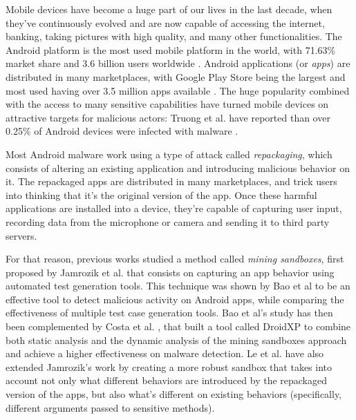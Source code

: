 Mobile devices have become a huge part of our lives in the last decade, when they've continuously evolved and are now capable of accessing the internet, banking, taking pictures with high quality, and many other functionalities. The Android platform is the most used mobile platform in the world, with 71.63\% market share and 3.6 billion users worldwide \cite{turner_how_nodate}. Android applications (or \textit{apps}) are distributed in many marketplaces, with Google Play Store being the largest and most used having over 3.5 million apps available \cite{turner_how_nodate-1}. The huge popularity combined with the access to many sensitive capabilities have turned mobile devices on attractive targets for malicious actors: Truong et al. have reported than over 0.25\% of Android devices were infected with malware \cite{truong_company_2014}.

Most Android malware work using a type of attack called \textit{repackaging}, which consists of altering an existing application and introducing malicious behavior on it. The repackaged apps are distributed in many marketplaces, and trick users into thinking that it's the original version of the app. Once these harmful applications are installed into a device, they're capable of capturing user input, recording data from the microphone or camera and sending it to third party servers.

For that reason, previous works studied a method called \textit{mining sandboxes}, first proposed by Jamrozik et al. \cite{jamrozik_mining_2016} that consists on capturing an app behavior using automated test generation tools. This technique was shown by Bao et al \cite{bao_mining_2018} to be an effective tool to detect malicious activity on Android apps, while comparing the effectiveness of multiple test case generation tools. Bao et al's study has then been complemented by Costa et al. \cite{costa_exploring_2022}, that built a tool called DroidXP to combine both static analysis and the dynamic analysis of the mining sandboxes approach and achieve a higher effectiveness on malware detection. Le et al.  \cite{le_towards_2018} have also extended Jamrozik's work by creating a more robust sandbox that takes into account not only what different behaviors are introduced by the repackaged version of the apps, but also what's different on existing behaviors (specifically, different arguments passed to sensitive methods).

